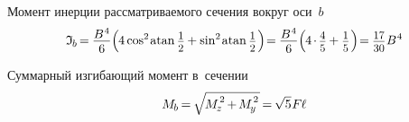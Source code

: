 \documentclass[14pt]{extarticle}
\begin{document}
\vspace{.2em}
Момент инерции рассматриваемого сечения вокруг оси~$b$
\[
 \mathfrak{I}_{\hspace{-0.1ex}\scalebox{.8}{$b$}} \hspace{-0.25ex}
=\hspace{-0.1ex}
\displaystyle\frac{\raisebox{-0.18em}{$B^{\hspace{.1ex}4}$}}{6} \Bigl(
\hspace{-0.1ex} 4 \operatorname{cos}^{2} \hspace{-0.22ex} \operatorname{atan} \scalebox{.88}{$\displaystyle\frac{\raisebox{-0.2em}{$1$}}{2}$}
\hspace{-0.1ex}+
\operatorname{sin}^{2} \hspace{-0.22ex} \operatorname{atan} \scalebox{.88}{$\displaystyle\frac{\raisebox{-0.2em}{$1$}}{2}$} \hspace{.2ex}
\Bigr) \hspace{-.45ex}
= \hspace{-0.1ex}
\displaystyle\frac{\raisebox{-0.18em}{$B^{\hspace{.1ex}4}$}}{6} \Bigl(
\hspace{-0.1ex} 4 \hspace{-.2ex}\cdot\hspace{-.2ex} \scalebox{.88}{$ \displaystyle\frac{\raisebox{-0.18em}{$4$}}{5} $}
\hspace{-0.1ex}+
\scalebox{.88}{$ \displaystyle\frac{\raisebox{-0.18em}{$1$}}{5} $}
\hspace{.2ex} \Bigr) \hspace{-.45ex}
= \hspace{-0.1ex}
\scalebox{.88}{$ \displaystyle\frac{\raisebox{-0.18em}{$17$}}{30} $} \hspace{.1ex} B^{\hspace{.1ex}4}
\]

Суммарный изгибающий момент в~сечении
\[
M_{\hspace{-0.1ex}\scalebox{.8}{$b$}} \hspace{-0.2ex}
=\hspace{-.2ex} \sqrt{\hspace{-0.2ex}M_{\hspace{-0.1ex}\scalebox{.8}{$z$}}^{\hspace{.2ex}\raisebox{.2em}{$\scriptstyle 2$}} \hspace{-0.2ex}+\hspace{-0.2ex} M_{\hspace{-0.1ex}\scalebox{.8}{$y$}}^{\hspace{.2ex}\raisebox{.2em}{$\scriptstyle 2$}}\hspace{.2ex}} \hspace{-.25ex}
=\hspace{-.2ex} \sqrt{5} \hspace{.1ex} F \hspace{-0.1ex} \ell
\]
\end{document}
